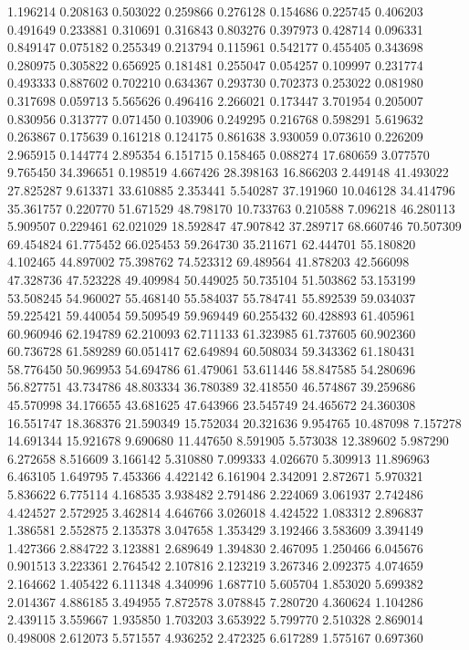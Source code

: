 1.196214
0.208163
0.503022
0.259866
0.276128
0.154686
0.225745
0.406203
0.491649
0.233881
0.310691
0.316843
0.803276
0.397973
0.428714
0.096331
0.849147
0.075182
0.255349
0.213794
0.115961
0.542177
0.455405
0.343698
0.280975
0.305822
0.656925
0.181481
0.255047
0.054257
0.109997
0.231774
0.493333
0.887602
0.702210
0.634367
0.293730
0.702373
0.253022
0.081980
0.317698
0.059713
5.565626
0.496416
2.266021
0.173447
3.701954
0.205007
0.830956
0.313777
0.071450
0.103906
0.249295
0.216768
0.598291
5.619632
0.263867
0.175639
0.161218
0.124175
0.861638
3.930059
0.073610
0.226209
2.965915
0.144774
2.895354
6.151715
0.158465
0.088274
17.680659
3.077570
9.765450
34.396651
0.198519
4.667426
28.398163
16.866203
2.449148
41.493022
27.825287
9.613371
33.610885
2.353441
5.540287
37.191960
10.046128
34.414796
35.361757
0.220770
51.671529
48.798170
10.733763
0.210588
7.096218
46.280113
5.909507
0.229461
62.021029
18.592847
47.907842
37.289717
68.660746
70.507309
69.454824
61.775452
66.025453
59.264730
35.211671
62.444701
55.180820
4.102465
44.897002
75.398762
74.523312
69.489564
41.878203
42.566098
47.328736
47.523228
49.409984
50.449025
50.735104
51.503862
53.153199
53.508245
54.960027
55.468140
55.584037
55.784741
55.892539
59.034037
59.225421
59.440054
59.509549
59.969449
60.255432
60.428893
61.405961
60.960946
62.194789
62.210093
62.711133
61.323985
61.737605
60.902360
60.736728
61.589289
60.051417
62.649894
60.508034
59.343362
61.180431
58.776450
50.969953
54.694786
61.479061
53.611446
58.847585
54.280696
56.827751
43.734786
48.803334
36.780389
32.418550
46.574867
39.259686
45.570998
34.176655
43.681625
47.643966
23.545749
24.465672
24.360308
16.551747
18.368376
21.590349
15.752034
20.321636
9.954765
10.487098
7.157278
14.691344
15.921678
9.690680
11.447650
8.591905
5.573038
12.389602
5.987290
6.272658
8.516609
3.166142
5.310880
7.099333
4.026670
5.309913
11.896963
6.463105
1.649795
7.453366
4.422142
6.161904
2.342091
2.872671
5.970321
5.836622
6.775114
4.168535
3.938482
2.791486
2.224069
3.061937
2.742486
4.424527
2.572925
3.462814
4.646766
3.026018
4.424522
1.083312
2.896837
1.386581
2.552875
2.135378
3.047658
1.353429
3.192466
3.583609
3.394149
1.427366
2.884722
3.123881
2.689649
1.394830
2.467095
1.250466
6.045676
0.901513
3.223361
2.764542
2.107816
2.123219
3.267346
2.092375
4.074659
2.164662
1.405422
6.111348
4.340996
1.687710
5.605704
1.853020
5.699382
2.014367
4.886185
3.494955
7.872578
3.078845
7.280720
4.360624
1.104286
2.439115
3.559667
1.935850
1.703203
3.653922
5.799770
2.510328
2.869014
0.498008
2.612073
5.571557
4.936252
2.472325
6.617289
1.575167
0.697360
